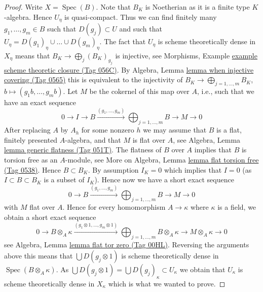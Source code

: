 \documentclass{amsart}
\theoremstyle{plain}
\theoremstyle{definition}
\theoremstyle{remark}
\numberwithin{equation}{subsection}
\def\Spec{\mathop{\mathrm{Spec}}}
\begin{document}
\begin{proof}
\medskip\noindent
Write $X = \Spec(B)$. Note that $B_K$ is Noetherian as it is a
finite type $K$-algebra. Hence $U_\eta$ is quasi-compact. Thus we can
find finitely many $g_1, \ldots, g_m \in B$ such that $D(g_j) \subset U$
and such that $U_\eta = D(g_1)_\eta \cup \ldots \cup D(g_m)_\eta$.
The fact that $U_\eta$ is scheme theoretically dense in
$X_\eta$ means that $B_K \to \bigoplus_j (B_K)_{g_j}$
is injective, see
Morphisms, Example \href{https://stacks.math.columbia.edu/tag/056C}{example scheme theoretic closure (Tag 056C)}.
By
Algebra, Lemma \href{https://stacks.math.columbia.edu/tag/0565}{lemma when injective covering (Tag 0565)}
this is equivalent to the injectivity of
$B_K \to \bigoplus\nolimits_{j = 1, \ldots, m} B_K$,
$b \mapsto (g_1b, \ldots, g_mb)$. Let $M$ be the cokernel of this
map over $A$, i.e., such that we have an exact sequence
$$
0 \to I \to B \xrightarrow{(g_1, \ldots, g_m)}
\bigoplus\nolimits_{j = 1, \ldots, m} B \to M \to 0
$$
After replacing $A$ by $A_h$ for some nonzero $h$ we may assume that $B$
is a flat, finitely presented $A$-algebra, and that $M$
is flat over $A$, see
Algebra, Lemma \href{https://stacks.math.columbia.edu/tag/051T}{lemma generic flatness (Tag 051T)}.
The flatness of $B$ over $A$ implies that $B$ is torsion free as an
$A$-module, see
More on Algebra, Lemma \href{https://stacks.math.columbia.edu/tag/0538}{lemma flat torsion free (Tag 0538)}.
Hence $B \subset B_K$. By assumption $I_K = 0$ which implies that $I = 0$
(as $I \subset B \subset B_K$ is a subset of $I_K$). Hence now
we have a short exact sequence
$$
0 \to B \xrightarrow{(g_1, \ldots, g_m)}
\bigoplus\nolimits_{j = 1, \ldots, m} B \to M \to 0
$$
with $M$ flat over $A$. Hence for every homomorphism $A \to \kappa$ where
$\kappa$ is a field, we obtain a short exact sequence
$$
0 \to B \otimes_A \kappa \xrightarrow{(g_1 \otimes 1, \ldots, g_m \otimes 1)}
\bigoplus\nolimits_{j = 1, \ldots, m} B \otimes_A \kappa \to
M \otimes_A \kappa \to 0
$$
see
Algebra, Lemma \href{https://stacks.math.columbia.edu/tag/00HL}{lemma flat tor zero (Tag 00HL)}.
Reversing the arguments above
this means that $\bigcup D(g_j \otimes 1)$ is scheme
theoretically dense in $\Spec(B \otimes_A \kappa)$.
As $\bigcup D(g_j \otimes 1) = \bigcup D(g_j)_\kappa \subset U_\kappa$
we obtain that $U_\kappa$ is scheme theoretically dense in $X_\kappa$
which is what we wanted to prove.
\end{proof}
\end{document}
